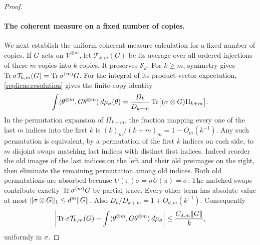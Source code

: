 \begin{proof}
\paragraph{The coherent measure on a fixed number of copies.}
We next establish the uniform coherent-measure calculation for a
fixed number of copies.  If $G$ acts on $\mathcal V^{\otimes m}$,
let $\mathcal T_{k,m}(G)$ be its average over all ordered injections
of these $m$ copies into $k$ copies.  It preserves $\mathcal S_k$.
For $k\ge m$, symmetry gives
$\operatorname{Tr}\sigma\mathcal T_{k,m}(G)=\operatorname{Tr}\sigma^{(m)}G$.
For the integral of its product-vector expectation,
\eqref{replicas:resolution} gives the finite-copy identity
\cite[equation~(5)]{Chiribella2011}
\begin{equation}\label{replicas:finite-husimi}
 \int\langle\theta^{\otimes m},G\theta^{\otimes m}\rangle
                         \,d\mu_\sigma(\theta)
 =\frac{D_k}{D_{k+m}}
       \operatorname{Tr}\bigl[(\sigma\otimes G)\Pi_{k+m}\bigr].
\end{equation}
In the permutation expansion of $\Pi_{k+m}$, the fraction mapping
every one of the last $m$ indices into the first $k$ is
$(k)_m/(k+m)_m=1-O_m(k^{-1})$.  Any such permutation is equivalent,
by a permutation of the first $k$ indices on each side, to $m$
disjoint swaps matching last indices with distinct first indices.
Indeed reorder the old images of the last indices on the left and
their old preimages on the right, then eliminate the remaining
permutation among old indices.  Both old permutations are absorbed
because $U(\pi)\sigma=\sigma U(\pi)=\sigma$.
The matched swaps contribute exactly $\operatorname{Tr}\sigma^{(m)}G$ by partial
trace.  Every other term has absolute value at most
$\lVert \sigma\otimes G\rVert_1\le d^m\lVert G\rVert$.
Also $D_k/D_{k+m}=1+O_{d,m}(k^{-1})$.  Consequently
\begin{equation}\label{replicas:uniform-husimi}
 \left|\operatorname{Tr}\sigma\mathcal T_{k,m}(G)
  -\int\langle\theta^{\otimes m},G\theta^{\otimes m}\rangle
                                      \,d\mu_\sigma\right|
 \le\frac{C_{d,m}\lVert G\rVert}{k},
\end{equation}
uniformly in $\sigma$.


\end{proof}
